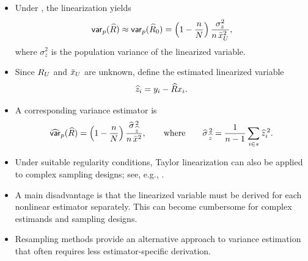 \documentclass{my_eth_beamer}
\numberwithin{equation}{section}
\begin{document}
\begin{frame}
    \begin{itemize}
    \setlength{\itemsep}{9pt}
        \item Under \SRS, the linearization yields
            \begin{equation*}
                \mathsf{var}_p(\widehat{R}) \approx \mathsf{var}_p(\widehat{R}_0) =
                \left(1-\frac{n}{N}\right)
                \frac{\sigma_z^2}{n\,\bar{x}_U^2},
            \end{equation*}
            where $\sigma_z^2$ is the population variance of the linearized
            variable.
        \item Since $R_U$ and $\bar{x}_U$ are unknown, define the
            \alert{estimated linearized variable}
            \begin{equation*}
                \widehat z_i = y_i - \widehat{R} x_i.
            \end{equation*}
        \item A corresponding \alert{variance estimator} is
            \begin{equation*}
                \widehat{\mathsf{var}}_p(\widehat{R}) =
                \left(1-\frac{n}{N}\right)
                \frac{\widehat{\sigma}_{\,\widehat{z}}^{\,2}}{n\,\bar{x}^2},
                \qquad \text{where} \qquad
                \widehat{\sigma}_{\,\widehat z}^{\,2} =
                \frac{1}{n-1}
                \sum_{i\in s}\widehat z_i^{\,2}.
            \end{equation*}
    \end{itemize}
\end{frame}

\begin{frame}
    \begin{itemize}
    \setlength{\itemsep}{10pt}
        \item Under suitable regularity conditions, Taylor linearization can
            also be applied to \alert{complex sampling designs}; see, e.g.,
            \citet[][Chapter 2.1]{fuller_2009}.

        \item A main \alert{disadvantage} is that the linearized variable must
            be derived for each nonlinear estimator separately. This can
            become cumbersome for complex estimands and sampling designs.

        \item \alert{Resampling methods} provide an alternative approach to
            variance estimation that often requires less estimator-specific
            derivation.
    \end{itemize}
\end{frame}
\end{document}
